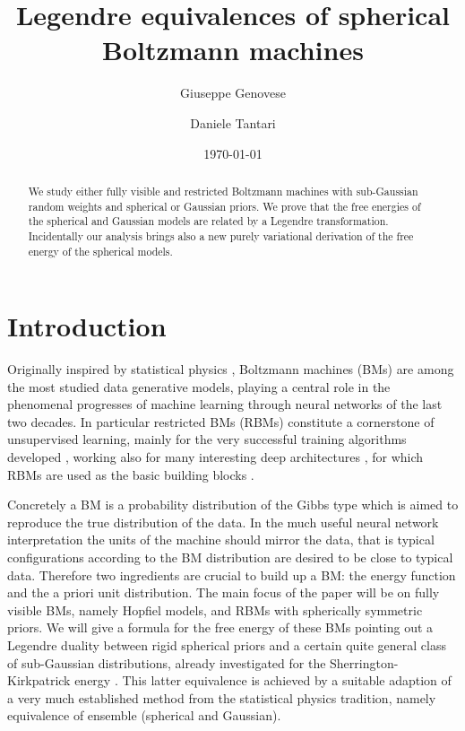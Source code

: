 \documentclass[10pt,oneside,a4paper,reqno]{amsart}  %
\author{Giuseppe Genovese}
\author{Daniele Tantari}
\title[Legendre equivalences of spherical Boltzmann machines]
{Legendre equivalences of spherical Boltzmann machines}
\date{\today}
\def\ni{\noindent}
\theoremstyle{plain}
\numberwithin{equation}{section}
\begin{document}
\begin{abstract}
We study either fully visible and restricted Boltzmann machines with sub-Gaussian random weights and spherical or Gaussian priors. We prove that the free energies of the spherical and Gaussian models are related by a Legendre transformation. Incidentally our analysis brings also a new purely variational derivation of the free energy of the spherical models. 
 
%
\end{abstract}

\pagestyle{plain}

\maketitle

\section{Introduction}

Originally inspired by statistical physics \cite{hop}, Boltzmann machines (BMs) \cite{BM,rm} are among the most studied data generative models, playing a central role in the phenomenal progresses of machine learning through neural networks of the last two decades. In particular restricted BMs (RBMs) constitute a cornerstone of unsupervised learning, mainly for the very successful training algorithms developed \cite{CD, CDp}, working also for many interesting deep architectures \cite{DBN, auto, belief}, for which RBMs are used as the basic building blocks \cite{deepBM, deepbook}. 

Concretely a BM is a probability distribution of the Gibbs type which is aimed to reproduce the true distribution of the data. In the much useful neural network interpretation the units of the machine should mirror the data, that is typical configurations according to the BM distribution are desired to be close to typical data. Therefore two ingredients are crucial to build up a BM: the energy function and the a priori unit distribution. The main focus of the paper will be on fully visible BMs, namely Hopfiel models, and RBMs with spherically symmetric priors. We will give a formula for the free energy of these BMs pointing out a Legendre duality between rigid spherical priors and a certain quite general class of sub-Gaussian distributions, already investigated for the Sherrington-Kirkpatrick energy \cite{legendre}. This latter equivalence is achieved by a suitable adaption of a very much established method from the statistical physics tradition, namely equivalence of ensemble (spherical and Gaussian). 
\end{document}
